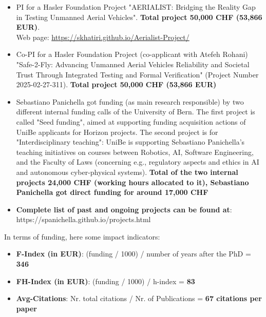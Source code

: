 \documentclass[11pt]{article}
\begin{document}
\begin{itemize}
\vspace{-2.5mm}
  \item PI for a Hasler Foundation Project "AERIALIST: Bridging the Reality Gap in Testing Unmanned Aerial Vehicles".  
\textbf{Total project 50,000 CHF (53,866 EUR)}. \\Web page: \href{https://skhatiri.github.io/Aerialist-Project/}{https://skhatiri.github.io/Aerialist-Project/} 
\vspace{-2.5mm}
  \item Co-PI for a Hasler Foundation Project (co-applicant with Atefeh Rohani) "Safe-2-Fly: Advancing Unmanned Aerial Vehicles Reliability and Societal Trust Through Integrated Testing and Formal Verification" (Project Number 2025-02-27-311).
\textbf{Total project 50,000 CHF (53,866 EUR)} 
\vspace{-2.5mm}
  \item Sebastiano Panichella got funding (as main research responsible) by two different internal funding calls of the University of Bern. 
The first project is called "Seed funding", aimed at supporting funding acquisition actions of UniBe applicants for Horizon projects.
The second project is for "Interdisciplinary teaching": UniBe is supporting Sebastiano Panichella's teaching initiatives on courses between Robotics, AI, Software Engineering, and the Faculty of Laws (concerning e.g., regulatory aspects and ethics in AI and autonomous cyber-physical systems).
\textbf{Total of the two internal projects 24,000 CHF (working hours allocated to it), Sebastiano Panichella got direct funding for around 17,000 CHF}
\vspace{-2.5mm}
  \item \textbf{Complete list of past and ongoing projects can be found at}:  https://spanichella.github.io/projects.html
\vspace{-3.5mm}
\end{itemize}


In terms of funding, here some impact indicators:
\begin{itemize}
  \item \textbf{F-Index (in EUR)}: (funding / 1000) / number of years after the PhD = \textbf{346}
  \item \textbf{FH-Index (in EUR)}: (funding / 1000) / h-index = \textbf{83}
  \item \textbf{Avg-Citations}: Nr. total citations / Nr. of Publications = \textbf{67 citations per paper}
\end{itemize}
\end{document}
